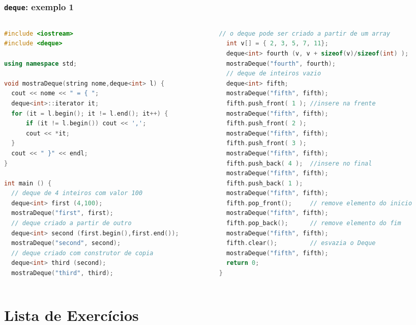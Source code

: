 \documentclass[xcolor={dvipsnames,table},aspectratio=169]{beamer}
\begin{document}
\begin{frame}[fragile]\frametitle{\texttt{deque}: exemplo 1}
\begin{columns}
\begin{column}{0.5\linewidth}
\begin{lstlisting}[language=C++,basicstyle=\ttfamily\tiny]
#include <iostream>
#include <deque>

using namespace std;

void mostraDeque(string nome,deque<int> l) {
  cout << nome << " = { ";
  deque<int>::iterator it;
  for (it = l.begin(); it != l.end(); it++) {
      if (it != l.begin()) cout << ',';
      cout << *it;
  }
  cout << " }" << endl;
}

int main () {
  // deque de 4 inteiros com valor 100
  deque<int> first (4,100);
  mostraDeque("first", first);
  // deque criado a partir de outro
  deque<int> second (first.begin(),first.end());
  mostraDeque("second", second);
  // deque criado com construtor de copia
  deque<int> third (second);
  mostraDeque("third", third);
\end{lstlisting}
\end{column}
\begin{column}{0.5\linewidth}
\begin{lstlisting}[language=C++,basicstyle=\ttfamily\tiny]
  // o deque pode ser criado a partir de um array
  int v[] = { 2, 3, 5, 7, 11};
  deque<int> fourth (v, v + sizeof(v)/sizeof(int) );
  mostraDeque("fourth", fourth);
  // deque de inteiros vazio
  deque<int> fifth;
  mostraDeque("fifth", fifth);
  fifth.push_front( 1 ); //insere na frente
  mostraDeque("fifth", fifth);
  fifth.push_front( 2 );
  mostraDeque("fifth", fifth);
  fifth.push_front( 3 );
  mostraDeque("fifth", fifth);
  fifth.push_back( 4 );  //insere no final
  mostraDeque("fifth", fifth);
  fifth.push_back( 1 );
  mostraDeque("fifth", fifth);
  fifth.pop_front();     // remove elemento do inicio
  mostraDeque("fifth", fifth);
  fifth.pop_back();      // remove elemento do fim
  mostraDeque("fifth", fifth);
  fifth.clear();         // esvazia o Deque
  mostraDeque("fifth", fifth);
  return 0;
}
\end{lstlisting}
\end{column}
\end{columns}
\end{frame}

\section{Lista de Exercícios}
\end{document}
